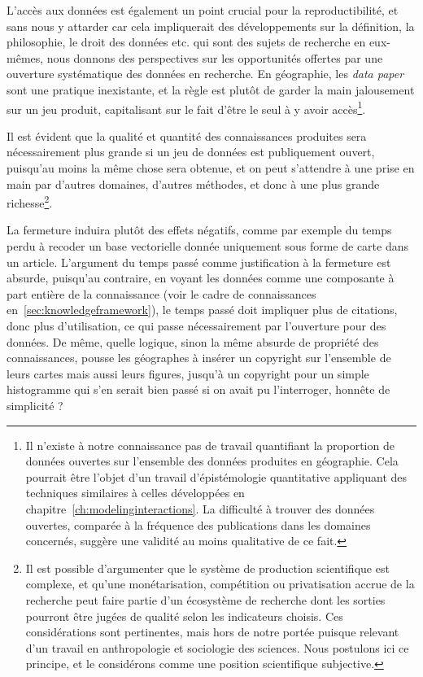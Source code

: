 

L'accès aux données est également un point crucial pour la reproductibilité, et sans nous y attarder car cela impliquerait des développements sur la définition, la philosophie, le droit des données etc. qui sont des sujets de recherche en eux-mêmes, nous donnons des perspectives sur les opportunités offertes par une ouverture systématique des données en recherche. En géographie, les \emph{data paper} sont une pratique inexistante, et la règle est plutôt de garder la main jalousement sur un jeu produit, capitalisant sur le fait d'être le seul à y avoir accès\footnote{Il n'existe à notre connaissance pas de travail quantifiant la proportion de données ouvertes sur l'ensemble des données produites en géographie. Cela pourrait être l'objet d'un travail d'épistémologie quantitative appliquant des techniques similaires à celles développées en chapitre~\ref{ch:modelinginteractions}. La difficulté à trouver des données ouvertes, comparée à la fréquence des publications dans les domaines concernés, suggère une validité au moins qualitative de ce fait.}.

Il est évident que la qualité et quantité des connaissances produites sera nécessairement plus grande si un jeu de données est publiquement ouvert, puisqu'au moins la même chose sera obtenue, et on peut s'attendre à une prise en main par d'autres domaines, d'autres méthodes, et donc à une plus grande richesse\footnote{Il est possible d'argumenter que le système de production scientifique est complexe, et qu'une monétarisation, compétition ou privatisation accrue de la recherche peut faire partie d'un écosystème de recherche dont les sorties pourront être jugées de qualité selon les indicateurs choisis. Ces considérations sont pertinentes, mais hors de notre portée puisque relevant d'un travail en anthropologie et sociologie des sciences. Nous postulons ici ce principe, et le considérons comme une position scientifique subjective.}.

La fermeture induira plutôt des effets négatifs, comme par exemple du temps perdu à recoder un base vectorielle donnée uniquement sous forme de carte dans un article. L'argument du temps passé comme justification à la fermeture est absurde, puisqu'au contraire, en voyant les données comme une composante à part entière de la connaissance (voir le cadre de connaissances en~\ref{sec:knowledgeframework}), le temps passé doit impliquer plus de citations, donc plus d'utilisation, ce qui passe nécessairement par l'ouverture pour des données. De même, quelle logique, sinon la même absurde de propriété des connaissances, pousse les géographes à insérer un copyright sur l'ensemble de leurs cartes mais aussi leurs figures, jusqu'à un copyright pour un simple histogramme qui s'en serait bien passé si on avait pu l'interroger, honnête de simplicité ?

